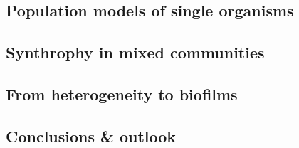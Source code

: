 \subsection{Population models of single organisms}
\subsection{Synthrophy in mixed communities}
\subsection{From heterogeneity to biofilms}
\subsection{Conclusions \& outlook}
